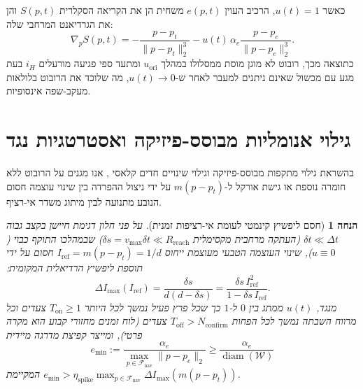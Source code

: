 \documentclass[10pt, a4paper, twocolumn]{article}
\newtheorem{assumption}{הנחה}
\begin{document}
כאשר $u(t) = 1$, הרכיב העוין $e(p, t)$ משחית הן את הקריאה הסקלרית $S(p, t)$ והן את הגרדיאנט המרחבי שלה:
\begin{equation}
    \nabla_p S(p, t) = -\frac{p - p_t}{\|p - p_t\|_2^3} - u(t)\,\alpha_e \frac{p - p_e}{\|p - p_e\|_2^3}.
    \label{eq:corrupted_grad}
\end{equation}
כתוצאה מכך, רובוט לא מוגן מוסת ממסלולו במהלך $u_{\text{ori}}$ ומתעד ספי פגיעה מורעלים $i_H$ בעת מגע עם מכשול שאינם ניתנים למעבר לאחר ש-$u(t) \to 0$, מה שלוכד את הרובוט בלולאות מעקב-שפה אינסופיות.

\section{גילוי אנומליות מבוסס-פיזיקה ואסטרטגיות נגד}

בהשראת גילוי מתקפות מבוסס-פיזיקה \cite{giraldo2018survey} וגילוי שינויים חדים קלאסי \cite{basseville1993detection}, אנו מגנים על הרובוט ללא חומרה נוספת או גישת אורקל ל-$m(p - p_t)$ על ידי ניצול ההפרדה בין שינוי עוצמה חסום הנובע מתנועה לבין מיתוג משדר אי-רציף.

\begin{assumption}[חסם ליפשיץ קינמטי לעומת אי-רציפות זמנית]
\label{assump:discontinuity}
על פני חלון דגימת חיישן בקצב גבוה $\delta t \ll \Delta t$ (העתקה מרחבית מקסימלית $\delta s = v_{\max}\delta t \ll R_{\text{reach}}$) שבמהלכו התוקף כבוי ($u \equiv 0$), שינוי העוצמה הטבעי מעוצמת ייחוס $I_{\text{ref}} = m(p - p_t) = 1/d$ חסום על ידי תוספת ליפשיץ הרדיאלית המקומית:
\begin{equation}
    \Delta I_{\max}(I_{\text{ref}}) = \frac{\delta s}{d(d - \delta s)} = \frac{\delta s\, I_{\text{ref}}^2}{1 - \delta s\, I_{\text{ref}}}.
    \label{eq:lipschitz}
\end{equation}
מנגד, $u(t)$ ממתג בין $0$ ל-$1$ כך שכל פרץ פעיל נמשך לכל היותר $T_{\text{on}} \ge 1$ צעדים וכל מרווח השבתה נמשך לכל הפחות $T_{\text{off}} > N_{\text{confirm}}$ צעדים (לוח זמנים מחזורי קבוע הוא מקרה פרטי), ומייצר קפיצת מדרגה מיידית
\begin{equation}
    e_{\min} := \frac{\alpha_e}{\max_{p \in \mathcal{F}_{\text{nav}}} \|p - p_e\|_2} \ge \frac{\alpha_e}{\operatorname{diam}(\mathcal{W})}
    \label{eq:emin_short}
\end{equation}
המקיימת $e_{\min} > \eta_{\text{spike}} \max_{p \in \mathcal{F}_{\text{nav}}} \Delta I_{\max}(m(p-p_t))$.
\end{assumption}
\end{document}
